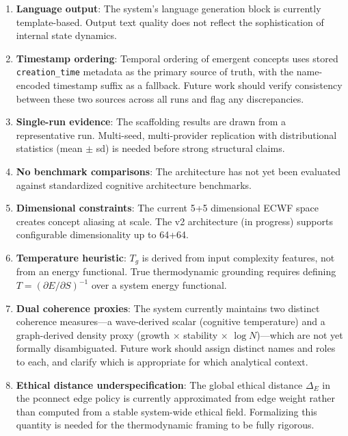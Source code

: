 \documentclass[11pt,a4paper]{article}
\begin{document}
\begin{enumerate}[nosep]
    \item \textbf{Language output}: The system's language generation block is 
          currently template-based. Output text quality does not reflect the 
          sophistication of internal state dynamics.
    \item \textbf{Timestamp ordering}: Temporal ordering of emergent concepts 
          uses stored \texttt{creation\_time} metadata as the primary source 
          of truth, with the name-encoded timestamp suffix as a fallback. 
          Future work should verify consistency between these two sources 
          across all runs and flag any discrepancies.
    \item \textbf{Single-run evidence}: The scaffolding results are drawn 
          from a representative run. Multi-seed, multi-provider replication 
          with distributional statistics (mean $\pm$ sd) is needed before 
          strong structural claims.
    \item \textbf{No benchmark comparisons}: The architecture has not yet been 
          evaluated against standardized cognitive architecture benchmarks.
    \item \textbf{Dimensional constraints}: The current 5+5 dimensional ECWF 
          space creates concept aliasing at scale. The v2 architecture 
          (in progress) supports configurable dimensionality up to 64+64.
    \item \textbf{Temperature heuristic}: $T_g$ is derived from input 
          complexity features, not from an energy functional. True 
          thermodynamic grounding requires defining $T = (\partial E / 
          \partial S)^{-1}$ over a system energy functional.
    \item \textbf{Dual coherence proxies}: The system currently maintains 
          two distinct coherence measures---a wave-derived scalar 
          (cognitive temperature) and a graph-derived density proxy 
          (growth $\times$ stability $\times$ $\log N$)---which are not 
          yet formally disambiguated. Future work should assign distinct 
          names and roles to each, and clarify which is appropriate for 
          which analytical context.
    \item \textbf{Ethical distance underspecification}: The global ethical 
          distance $\Delta_E$ in the pconnect edge policy is currently 
          approximated from edge weight rather than computed from a 
          stable system-wide ethical field. Formalizing this quantity is 
          needed for the thermodynamic framing to be fully rigorous.
\end{enumerate}
\end{document}
